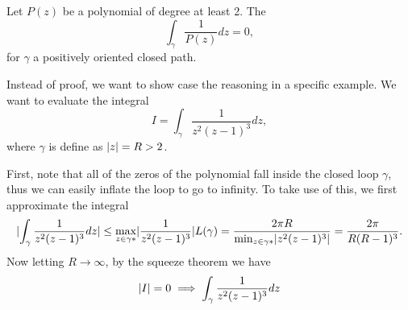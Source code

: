 \begin{fact}
	Let $P(z)$ be a polynomial of degree at least 2. The 
	\[ \int_{\gamma}\frac{1}{P(z)} dz = 0, \]
	for $\gamma$ a positively oriented closed path.
\end{fact}
\begin{exm}
	Instead of proof, we want to show case the reasoning in a specific example. We want to evaluate the integral
	\[ I = \int_{\gamma} \frac{1}{z^2(z-1)^3} dz, \]
	where $\gamma$ is define as $\lvert z \rvert = R > 2$. 
\end{exm}
\begin{answer}
	First, note that all of the zeros of the polynomial fall inside the closed loop $\gamma$, thus we can easily inflate the loop to go to infinity. To take use of this, we first approximate the integral 
	\[ \lvert \int_{\gamma} \frac{1}{z^2(z-1)^3} dz \rvert \leq \max_{z\in \gamma*} \lvert \frac{1}{z^2(z-1)^3} \rvert L(\gamma) = \frac{2\pi R}{ \min_{z\in \gamma*} \lvert z^2(z-1)^3 \rvert}= \frac{2\pi}{R(R-1)^3}.\]
	Now letting $R\to\infty$, by the squeeze theorem we have
	\[ \lvert I \rvert = 0 \implies \int_{\gamma} \frac{1}{z^2(z-1)^3} dz \]
\end{answer}





























